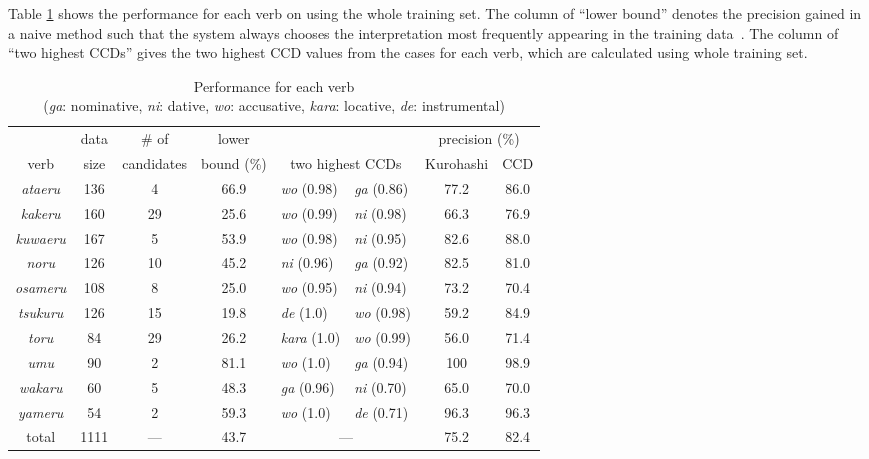 Table \ref{tab:compare} shows the performance for each verb on using
the whole training set.  The column of ``lower bound'' denotes the
precision gained in a naive method such that the system always chooses
the interpretation most frequently appearing in the training
data~\cite{gale:92}.  The column of ``two highest CCDs'' gives the two
highest CCD values from the cases for each verb, which are calculated
using whole training set.

\begin{table}[htbp]
  \caption{Performance for each verb \\ ({\it ga\/}: nominative, {\it
      ni\/}: dative, {\it wo\/}: accusative, {\it kara\/}: locative, {\it
      de\/}: instrumental)}
  \begin{center}
    \leavevmode
    \begin{tabular}{|c||c|c|c||ll||c|c|} \hline
      & data & \# of & lower & & &
      \multicolumn{2}{c|}{precision (\%)} \\ \cline{7-8} verb & size &
      candidates & bound (\%) & \multicolumn{2}{c||}{two highest CCDs}
      & Kurohashi & CCD \\ \hline \hline
      {\it ataeru\/} & 136 & 4 & 66.9 & {\it wo\/} (0.98) & {\it ga\/}
      (0.86) & 77.2 & 86.0 \\ \hline
      {\it kakeru\/} & 160 & 29 & 25.6 & {\it wo\/} (0.99) & {\it ni\/}
      (0.98) & 66.3 & 76.9 \\ \hline
      {\it kuwaeru\/} & 167 & 5 & 53.9 & {\it wo\/} (0.98) & {\it ni\/}
      (0.95) & 82.6 & 88.0 \\ \hline
      {\it noru\/} & 126 & 10 & 45.2 & {\it ni\/} (0.96) & {\it ga\/}
      (0.92) & 82.5 & 81.0 \\ \hline
      {\it osameru\/} & 108 & 8 & 25.0 & {\it wo\/} (0.95) & {\it ni\/}
      (0.94) & 73.2 & 70.4 \\ \hline
      {\it tsukuru\/} & 126 & 15 & 19.8 & {\it de\/} (1.0) & {\it wo\/}
      (0.98) & 59.2 & 84.9 \\ \hline
      {\it toru\/} & 84 & 29 & 26.2 & {\it kara\/} (1.0) & {\it wo\/}
      (0.99) &  56.0 & 71.4 \\ \hline
      {\it umu\/} & 90 & 2 & 81.1 & {\it wo\/} (1.0) & {\it ga\/}
      (0.94) & 100 & 98.9 \\ \hline
      {\it wakaru\/} & 60 & 5 & 48.3 & {\it ga\/} (0.96) & {\it ni\/}
      (0.70) & 65.0 & 70.0 \\ \hline
      {\it yameru\/} & 54 & 2 & 59.3 & {\it wo\/} (1.0) & {\it de\/}
      (0.71) & 96.3 & 96.3 \\ \hline \hline
      total & 1111 & --- & 43.7 & \multicolumn{2}{c|}{---} & 75.2 & 82.4
      \\ \hline
    \end{tabular}
  \end{center}
  \label{tab:compare}
\end{table}

